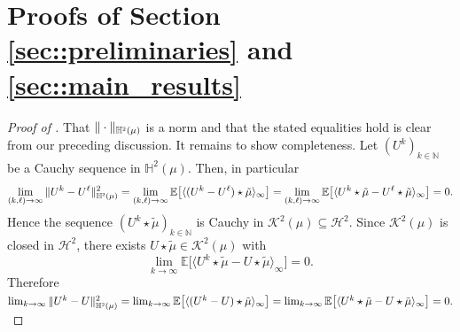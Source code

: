 \documentclass[10pt]{article} %
\newcommand\cH{\mathcal H}
\newcommand\cK{\mathcal K}
\newcommand{\smalltext}[1]{\text{\fontsize{4}{4}\selectfont$#1$}}
\def \E{\mathbb{E}}
\def \H{\mathbb{H}}
\def \N{\mathbb{N}}
\newcommand{\1}{\mathbf{1}}
\begin{document}
\appendix

\section{Proofs of Section \ref{sec::preliminaries} and \ref{sec::main_results}}\label{app::proofs_preliminaries}

\begin{proof}[Proof of ]\label{proof::completeness_ivm}
	That $\|\cdot\|_{\H^\smalltext{2}(\mu)}$ is a norm and that the stated equalities hold is clear from our preceding discussion. It remains to show completeness. Let $(U^k)_{k \in \N}$ be a Cauchy sequence in $\H^2(\mu)$. 
	Then, in particular
	\begin{equation*}
		\lim_{(k,\ell) \rightarrow \infty}\|U^k - U^\ell\|^2_{\H^\smalltext{2}(\mu)} = \lim_{(k,\ell) \rightarrow \infty}\E\big[\langle (U^k - U^\ell) \star \tilde\mu\rangle_\infty \big] = \lim_{(k,\ell) \rightarrow \infty}\E\big[\langle U^k \star \tilde\mu - U^\ell \star \tilde\mu\rangle_\infty \big] = 0.
	\end{equation*}
	Hence the sequence $(U^k \star \tilde\mu)_{k \in \N}$ is Cauchy in $\cK^2(\mu) \subseteq \cH^2$. Since $\cK^2(\mu)$ is closed in $\cH^2$, there exists $U \star \tilde\mu \in \cK^2(\mu)$ with
	\begin{equation*}
		\lim_{k \rightarrow \infty}\E\big[\langle U^k \star \tilde\mu - U \star \tilde\mu \rangle_\infty \big] = 0.
	\end{equation*}
	Therefore $\lim_{k \rightarrow \infty}\|U^k - U\|^2_{\H^\smalltext{2}(\mu)} = \lim_{k \rightarrow \infty}\E\big[\langle (U^k - U) \star \tilde\mu\rangle_\infty \big] = \lim_{k \rightarrow \infty}\E\big[\langle U^k \star \tilde\mu - U \star \tilde\mu\rangle_\infty \big]= 0.$
\end{proof}
\end{document}
